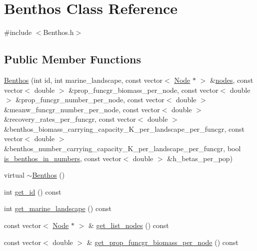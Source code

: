 \hypertarget{class_benthos}{}\section{Benthos Class Reference}
\label{class_benthos}


{\ttfamily \#include $<$Benthos.\+h$>$}

\subsection*{Public Member Functions}
\begin{DoxyCompactItemize}
\item 
\mbox{\hyperlink{class_benthos_a5030be8685944dc189b9980fb9fa3ae6}{Benthos}} (int id, int marine\+\_\+landscape, const vector$<$ \mbox{\hyperlink{class_node}{Node}} $\ast$ $>$ \&\mbox{\hyperlink{thread__vessels_8cpp_ace5675146c8515428d094fd142d8a2d2}{nodes}}, const vector$<$ double $>$ \&prop\+\_\+funcgr\+\_\+biomass\+\_\+per\+\_\+node, const vector$<$ double $>$ \&prop\+\_\+funcgr\+\_\+number\+\_\+per\+\_\+node, const vector$<$ double $>$ \&meanw\+\_\+funcgr\+\_\+number\+\_\+per\+\_\+node, const vector$<$ double $>$ \&recovery\+\_\+rates\+\_\+per\+\_\+funcgr, const vector$<$ double $>$ \&benthos\+\_\+biomass\+\_\+carrying\+\_\+capacity\+\_\+\+K\+\_\+per\+\_\+landscape\+\_\+per\+\_\+funcgr, const vector$<$ double $>$ \&benthos\+\_\+number\+\_\+carrying\+\_\+capacity\+\_\+\+K\+\_\+per\+\_\+landscape\+\_\+per\+\_\+funcgr, bool \mbox{\hyperlink{thread__vessels_8cpp_a18eba4224a5ba1903a19868de715cf93}{is\+\_\+benthos\+\_\+in\+\_\+numbers}}, const vector$<$ double $>$ \&h\+\_\+betas\+\_\+per\+\_\+pop)
\item 
virtual \mbox{\hyperlink{class_benthos_a172b056d9a8a28735649d66a0d86b2f8}{$\sim$\+Benthos}} ()
\item 
int \mbox{\hyperlink{class_benthos_a893fc51faf9c73ddeb91eb548c9bed48}{get\+\_\+id}} () const
\item 
int \mbox{\hyperlink{class_benthos_a6c3358bc1443a3f3826575cae2cdf46b}{get\+\_\+marine\+\_\+landscape}} () const
\item 
const vector$<$ \mbox{\hyperlink{class_node}{Node}} $\ast$ $>$ \& \mbox{\hyperlink{class_benthos_a5c95a9ded9dccd92bdc568ceee2c7d76}{get\+\_\+list\+\_\+nodes}} () const
\item 
const vector$<$ double $>$ \& \mbox{\hyperlink{class_benthos_aa2f8979325d5948c2c68c2d630c54c7e}{get\+\_\+prop\+\_\+funcgr\+\_\+biomass\+\_\+per\+\_\+node}} () const
\item 

\end{DoxyCompactItemize}
